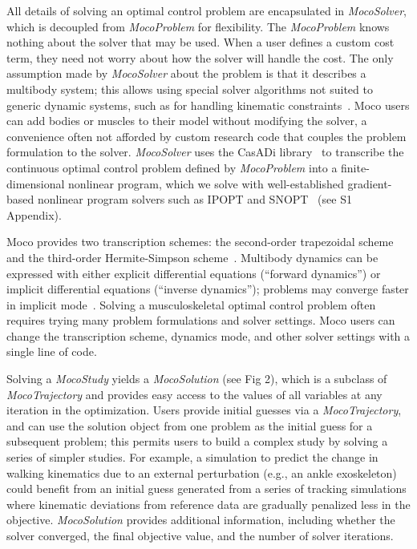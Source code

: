 \documentclass[10pt,letterpaper]{article}
\begin{document}
All details of solving an optimal control problem are encapsulated in \textit{MocoSolver}, which is decoupled from \textit{MocoProblem} for flexibility. The \textit{MocoProblem} knows nothing about the solver that may be used. When a user defines a custom cost term, they need not worry about how the solver will handle the cost. The only assumption made by \textit{MocoSolver} about the problem is that it describes a multibody system; this allows using special solver algorithms not suited to generic dynamic systems, such as for handling kinematic constraints~\cite{Posa:2016}. Moco users can add bodies or muscles to their model without modifying the solver, a convenience often not afforded by custom research code that couples the problem formulation to the solver. \textit{MocoSolver} uses the CasADi library~\cite{Andersson:2019} to transcribe the continuous optimal control problem defined by \textit{MocoProblem} into a finite-dimensional nonlinear program, which we solve with well-established gradient-based nonlinear program solvers such as IPOPT and SNOPT~\cite{Wachter:2006,Gill:2005} (see S1 Appendix).

Moco provides two transcription schemes: the second-order trapezoidal scheme and the third-order Hermite-Simpson scheme~\cite{Betts:2010}. Multibody dynamics can be expressed with either explicit differential equations (“forward dynamics”) or implicit differential equations (“inverse dynamics”); problems may converge faster in implicit mode~\cite{vandenBogert:2011fv}. Solving a musculoskeletal optimal control problem often requires trying many problem formulations and solver settings. Moco users can change the transcription scheme, dynamics mode, and other solver settings with a single line of code.

Solving a \textit{MocoStudy} yields a \textit{MocoSolution} (see Fig 2), which is a subclass of \textit{MocoTrajectory} and provides easy access to the values of all variables at any iteration in the optimization. Users provide initial guesses via a \textit{MocoTrajectory}, and can use the solution object from one problem as the initial guess for a subsequent problem; this permits users to build a complex study by solving a series of simpler studies. For example, a simulation to predict the change in walking kinematics due to an external perturbation (e.g., an ankle exoskeleton) could benefit from an initial guess generated from a series of tracking simulations where kinematic deviations from reference data are gradually penalized less in the objective.  \textit{MocoSolution} provides additional information, including whether the solver converged, the final objective value, and the number of solver iterations.
\end{document}
